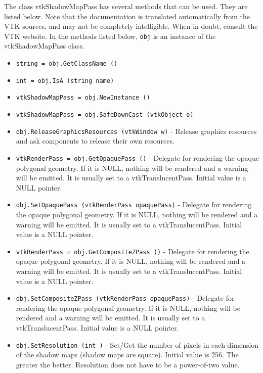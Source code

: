 The class vtkShadowMapPass has several methods that can be used.
  They are listed below.
Note that the documentation is translated automatically from the VTK sources,
and may not be completely intelligible.  When in doubt, consult the VTK website.
In the methods listed below, \verb|obj| is an instance of the vtkShadowMapPass class.
\begin{itemize}
\item  \verb|string = obj.GetClassName ()|

\item  \verb|int = obj.IsA (string name)|

\item  \verb|vtkShadowMapPass = obj.NewInstance ()|

\item  \verb|vtkShadowMapPass = obj.SafeDownCast (vtkObject o)|

\item  \verb|obj.ReleaseGraphicsResources (vtkWindow w)| -  Release graphics resources and ask components to release their own
 resources.
 

\item  \verb|vtkRenderPass = obj.GetOpaquePass ()| -  Delegate for rendering the opaque polygonal geometry.
 If it is NULL, nothing will be rendered and a warning will be emitted.
 It is usually set to a vtkTranslucentPass.
 Initial value is a NULL pointer.

\item  \verb|obj.SetOpaquePass (vtkRenderPass opaquePass)| -  Delegate for rendering the opaque polygonal geometry.
 If it is NULL, nothing will be rendered and a warning will be emitted.
 It is usually set to a vtkTranslucentPass.
 Initial value is a NULL pointer.

\item  \verb|vtkRenderPass = obj.GetCompositeZPass ()| -  Delegate for rendering the opaque polygonal geometry.
 If it is NULL, nothing will be rendered and a warning will be emitted.
 It is usually set to a vtkTranslucentPass.
 Initial value is a NULL pointer.

\item  \verb|obj.SetCompositeZPass (vtkRenderPass opaquePass)| -  Delegate for rendering the opaque polygonal geometry.
 If it is NULL, nothing will be rendered and a warning will be emitted.
 It is usually set to a vtkTranslucentPass.
 Initial value is a NULL pointer.

\item  \verb|obj.SetResolution (int )| -  Set/Get the number of pixels in each dimension of the shadow maps
 (shadow maps are square). Initial value is 256. The greater the better.
 Resolution does not have to be a power-of-two value.


\end{itemize}
